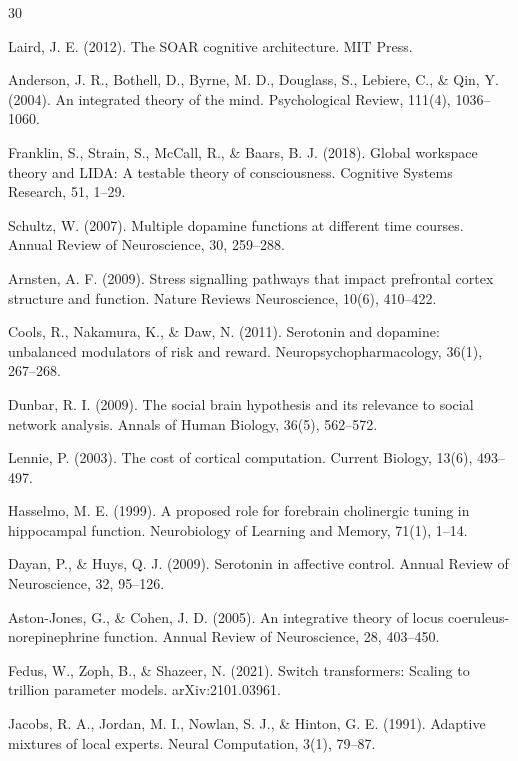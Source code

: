 \documentclass[preprint,12pt]{elsarticle}
\begin{document}
\begin{thebibliography}{30}

Laird, J. E. (2012). The SOAR cognitive architecture. MIT Press.

Anderson, J. R., Bothell, D., Byrne, M. D., Douglass, S., Lebiere, C., \& Qin, Y. (2004). An integrated theory of the mind. Psychological Review, 111(4), 1036--1060.

Franklin, S., Strain, S., McCall, R., \& Baars, B. J. (2018). Global workspace theory and LIDA: A testable theory of consciousness. Cognitive Systems Research, 51, 1--29.

Schultz, W. (2007). Multiple dopamine functions at different time courses. Annual Review of Neuroscience, 30, 259--288.

Arnsten, A. F. (2009). Stress signalling pathways that impact prefrontal cortex structure and function. Nature Reviews Neuroscience, 10(6), 410--422.

Cools, R., Nakamura, K., \& Daw, N. (2011). Serotonin and dopamine: unbalanced modulators of risk and reward. Neuropsychopharmacology, 36(1), 267--268.

Dunbar, R. I. (2009). The social brain hypothesis and its relevance to social network analysis. Annals of Human Biology, 36(5), 562--572.

Lennie, P. (2003). The cost of cortical computation. Current Biology, 13(6), 493--497.

Hasselmo, M. E. (1999). A proposed role for forebrain cholinergic tuning in hippocampal function. Neurobiology of Learning and Memory, 71(1), 1--14.

Dayan, P., \& Huys, Q. J. (2009). Serotonin in affective control. Annual Review of Neuroscience, 32, 95--126.

Aston-Jones, G., \& Cohen, J. D. (2005). An integrative theory of locus coeruleus-norepinephrine function. Annual Review of Neuroscience, 28, 403--450.

Fedus, W., Zoph, B., \& Shazeer, N. (2021). Switch transformers: Scaling to trillion parameter models. arXiv:2101.03961.

Jacobs, R. A., Jordan, M. I., Nowlan, S. J., \& Hinton, G. E. (1991). Adaptive mixtures of local experts. Neural Computation, 3(1), 79--87.


\end{thebibliography}
\end{document}
